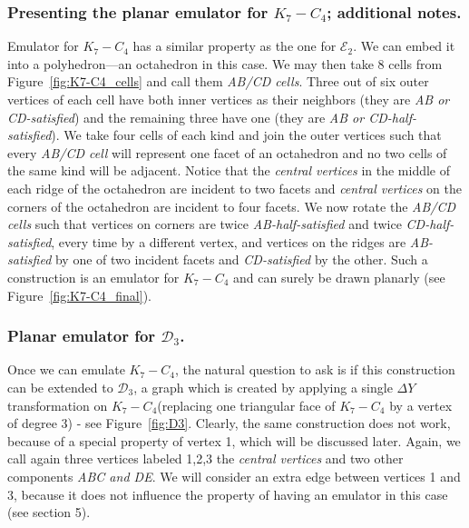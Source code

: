 \documentclass[envcountsect,envcountsame]{llncs}
\renewenvironment{accumulate}{}{}
\newcommand{\KK}{\ensuremath{{K}_7 - C_4}\xspace}
\newcommand{\DD}{\ensuremath{\mathcal{D}_3}\xspace}
\newcommand{\EE}{\ensuremath{\mathcal{E}_2}\xspace}
\begin{document}
\begin{accumulate}
\subsubsection*{Presenting the planar emulator for \KK; additional notes.}

Emulator for \KK has a similar property as the one for \EE. We can
embed it into a polyhedron---an octahedron in this case.  We may then
 take 8 cells from Figure~\ref{fig:K7-C4_cells} and call
them \textit{AB/CD cells}.  Three out of six outer vertices of each cell
have both inner vertices as their neighbors (they are \textit{AB or
CD-satisfied}) and the remaining three have one (they are \textit{AB or
CD-half-satisfied}).  We take four cells of each kind and join the outer
vertices such that every \textit{AB/CD cell} will represent one facet of an
octahedron and no two cells of the same kind will be adjacent.  Notice that
the \textit{central vertices} in the middle of each ridge of the octahedron
are incident to two facets and \textit{central vertices} on the corners of
the octahedron are incident to four facets.  We now rotate the \textit{AB/CD
cells} such that vertices on corners are twice \textit{AB-half-satisfied}
and twice \textit{CD-half-satisfied}, every time by a different vertex, and
vertices on the ridges are \textit{AB-satisfied} by one of two incident
facets and \textit{CD-satisfied} by the other.  Such a construction is an
emulator for \KK and can surely be drawn planarly (see
Figure~\ref{fig:K7-C4_final}).



\subsubsection{Planar emulator for \DD.}

Once we can emulate \KK, the natural question to ask is if this construction
can be extended to \DD, a graph which is created by applying a single
{\ensuremath{\Delta Y}} transformation on \KK (replacing one triangular face
of \KK by a vertex of degree 3) - see Figure~\ref{fig:D3}.  Clearly, the
same construction does not work, because of a special property of
vertex 1, which will be discussed later.  Again, we call again three vertices
labeled 1,2,3 the \textit{central vertices} and two other components
\textit{ABC and DE}.  We will consider an extra edge between
vertices 1 and 3, because it does not influence the property of having an
emulator in this case (see section 5).



\end{accumulate}
\end{document}
